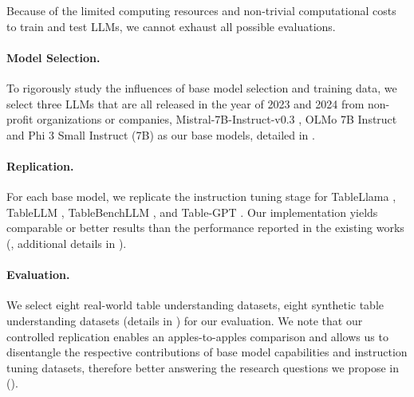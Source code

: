 \documentclass[11pt]{article}
\begin{document}

Because of the limited computing resources and non-trivial computational costs to train and test LLMs, we cannot exhaust all possible evaluations.
\paragraph{Model Selection.}
To rigorously study the influences of base model selection and training data, we select three LLMs that are all released in the year of 2023 and 2024 from non-profit organizations or companies, Mistral-7B-Instruct-v0.3 \citep{jiang2023mistral}, OLMo 7B Instruct \citep{groeneveld2024olmo} and Phi 3 Small Instruct (7B) \citep{abdin2024phi} as our base models, detailed in .
\paragraph{Replication.}
For each base model, we replicate the instruction tuning stage for TableLlama \citep{zhang-etal-2024-tablellama}, TableLLM \citep{zhang2024tablellm}, TableBenchLLM \citep{wu2025tablebench}, and Table-GPT \citep{li2023table}.
Our implementation yields comparable or better results than the performance reported in the existing works (, additional details in ). 
\paragraph{Evaluation.}
We select eight real-world table understanding datasets, eight synthetic table understanding datasets
(details in ) for our evaluation.
We note that our controlled replication enables an apples-to-apples comparison and allows us to disentangle the respective contributions of base model capabilities and instruction tuning datasets, therefore better answering the research questions we propose in  (). 
\end{document}

